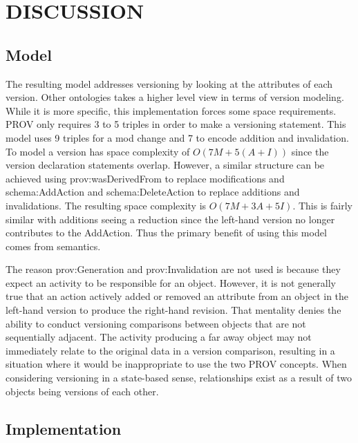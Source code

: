 
\chapter{DISCUSSION}

\section{Model}

The resulting model addresses versioning by looking at the attributes of each version.
Other ontologies takes a higher level view in terms of version modeling.
While it is more specific, this implementation forces some space requirements.
PROV only requires 3 to 5 triples in order to make a versioning statement.
This model uses 9 triples for a mod change and 7 to encode addition and invalidation.
To model a version has space complexity of \(O(7M+5(A+I))\) since the version declaration statements overlap.
However, a similar structure can be achieved using prov:wasDerivedFrom to replace modifications and schema:AddAction and schema:DeleteAction to replace additions and invalidations.
The resulting space complexity is \(O(7M+3A+5I)\).
This is fairly similar with additions seeing a reduction since the left-hand version no longer contributes to the AddAction.
Thus the primary benefit of using this model comes from semantics.

The reason prov:Generation and prov:Invalidation are not used is because they expect an activity to be responsible for an object.
However, it is not generally true that an action actively added or removed an attribute from an object in the left-hand version to produce the right-hand revision.
That mentality denies the ability to conduct versioning comparisons between objects that are not sequentially adjacent.
The activity producing a far away object may not immediately relate to the original data in a version comparison, resulting in a situation where it would be inappropriate to use the two PROV concepts.
When considering versioning in a state-based sense, relationships exist as a result of two objects being versions of each other.

\section{Implementation}

